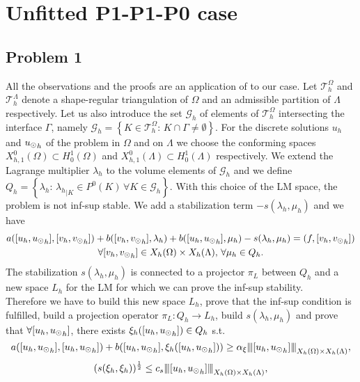 \section{Unfitted P1-P1-P0 case}
\subsection{Problem 1} All the observations and the proofs are an application of \cite{burman2014} to our case. Let $\mathcal{T}^{\Omega}_h$ and  $\mathcal{T}^{\Lambda}_{h}$ denote a shape-regular triangulation  of $\Omega$ and an admissible partition  of $\Lambda$ respectively. Let us also introduce the set $\mathcal{G}_h$ of elements of $\mathcal{T}^{\Omega}_h$ intersecting the interface $\Gamma$, namely $\mathcal{G}_h=\left\{ K\in \mathcal{T}^{\Omega}_h : \, K\cap \Gamma \neq \emptyset \right\}$. For the discrete solutions $u_h$ and ${u_{\odot}}_h$ of the problem in $\Omega$ and on $\Lambda$ we choose the conforming spaces $X_{h,1}^0(\Omega)\subset H^1_0(\Omega)$ and  $X_{h,1}^0(\Lambda)\subset H^1_0(\Lambda)$ respectively. We extend the Lagrange multiplier $\lambda_h$ to the volume elements of $\mathcal{G}_h$ and we define $Q_h=\left\{\lambda_h: \, {\lambda_h}_{|K}\in P^0(K)\,  \forall K\in \mathcal{G}_h\right\}$. With this choice of the LM space, the problem is not inf-sup stable. We add a stabilization term $-s(\lambda_h, \mu_h)$ and we have
\begin{multline*}
a([u_h, {u_{\odot}}_h], [v_h, {v_{\odot}}_h]) + b([v_h, {v_{\odot}}_h], \lambda_h) + b([u_h, {u_{\odot}}_h], \mu_h) - s(\lambda_h, \mu_h)= (f, [v_h, {v_{\odot}}_h])\\
 \forall [v_h, {v_{\odot}}_h]\in X_h(\Omega)\times X_h(\Lambda) ,\, \forall \mu_h \in Q_h.
\end{multline*}
The stabilization $s(\lambda_h, \mu_h)$ is connected to a projector $\pi_L$ between $Q_h$ and a new space $L_h$ for the LM for which we can prove the inf-sup stability.\\
Therefore we have to build this new space $L_h$, prove that the inf-sup condition is fulfilled, build a projection operator $\pi_L: Q_h \rightarrow L_h$, build $s(\lambda_h, \mu_h)$ and prove that $\forall [u_h, {u_{\odot}}_h]$, there exists $\xi_h([u_h, {u_{\odot}}_h]) \in Q_h$ s.t.  
\begin{equation}\label{stab_coercivity}
a([u_h, {\ud}_h],[u_h, {\ud}_h] ) + b([u_h, {\ud}_h], \xi_h([u_h, {\ud}_h])) \geq \alpha_\xi \vertiii{[u_h, {\ud}_h]}_{X_h(\Omega)\times X_h(\Lambda) },
\end{equation}
\begin{equation}\label{stab_stability}
(s(\xi_{h}, \xi_{h}))^{\frac 12} \leq c_s \vertiii{[u_h, {\ud}_h]}_{X_h(\Omega)\times X_h(\Lambda) },
\end{equation}
